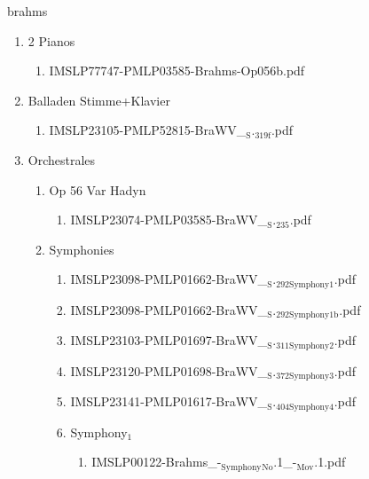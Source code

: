 \documentclass[11pt]{article}
\begin{document}
\item brahms
\label{sec-1-1-1-1-44-15}
\begin{enumerate}
\item 2 Pianos
\label{sec-1-1-1-1-44-15-1}
\begin{enumerate}
\item IMSLP77747-PMLP03585-Brahms-Op056b.pdf
\label{sec-1-1-1-1-44-15-1-1}
\end{enumerate}

\item Balladen Stimme+Klavier
\label{sec-1-1-1-1-44-15-2}
\begin{enumerate}
\item IMSLP23105-PMLP52815-BraWV\_$_{\text{S}}$.$_{\text{319f}}$.pdf
\label{sec-1-1-1-1-44-15-2-1}
\end{enumerate}

\item Orchestrales
\label{sec-1-1-1-1-44-15-3}
\begin{enumerate}
\item Op 56 Var Hadyn
\label{sec-1-1-1-1-44-15-3-1}
\begin{enumerate}
\item IMSLP23074-PMLP03585-BraWV\_$_{\text{S}}$.$_{\text{235}}$.pdf
\label{sec-1-1-1-1-44-15-3-1-1}
\end{enumerate}

\item Symphonies
\label{sec-1-1-1-1-44-15-3-2}
\begin{enumerate}
\item IMSLP23098-PMLP01662-BraWV\_$_{\text{S}}$.$_{\text{292Symphony1}}$.pdf
\label{sec-1-1-1-1-44-15-3-2-1}

\item IMSLP23098-PMLP01662-BraWV\_$_{\text{S}}$.$_{\text{292Symphony1b}}$.pdf
\label{sec-1-1-1-1-44-15-3-2-2}

\item IMSLP23103-PMLP01697-BraWV\_$_{\text{S}}$.$_{\text{311Symphony2}}$.pdf
\label{sec-1-1-1-1-44-15-3-2-3}

\item IMSLP23120-PMLP01698-BraWV\_$_{\text{S}}$.$_{\text{372Symphony3}}$.pdf
\label{sec-1-1-1-1-44-15-3-2-4}

\item IMSLP23141-PMLP01617-BraWV\_$_{\text{S}}$.$_{\text{404Symphony4}}$.pdf
\label{sec-1-1-1-1-44-15-3-2-5}

\item Symphony$_{\text{1}}$
\label{sec-1-1-1-1-44-15-3-2-6}
\begin{enumerate}
\item IMSLP00122-Brahms\_-$_{\text{Symphony}}$$_{\text{No}}$.1\_-$_{\text{Mov}}$.1.pdf
\label{sec-1-1-1-1-44-15-3-2-6-1}


\end{enumerate}
\end{enumerate}
\end{enumerate}
\end{enumerate}
\end{document}
